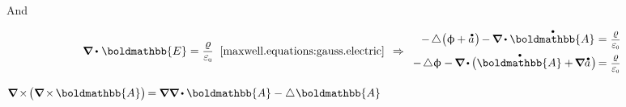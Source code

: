 And

\nopagebreak\vspace{-0.1em}\begin{equation}\label{electromagnetic.firstequationofwave}
\boldnabla \dotp \hspace{.12ex} \boldmathbb{E} = \displaystyle \frac{\chargedensity}{\raisemath{.16em}{\vacuumpermittivity}}
\;\;\eqref{maxwell.equations:gauss.electric}
\hspace{.44em} \Rightarrow
%
\begin{array}{r@{\hspace{.3em}}c@{\hspace{.3em}}l}
- \hspace{-0.1ex} \Laplacian \bigl( \upphi \hspace{-0.1ex} + \mathdotabove{a} \hspace{.1ex} \bigr) \hspace{-0.2ex} - \hspace{-0.15ex} \boldnabla \hspace{-0.1ex} \dotp \mathdotabove{\boldmathbb{A}} & = & \scalebox{0.9}{$\displaystyle \frac{\chargedensity}{\raisemath{.16em}{\vacuumpermittivity}}$}
\\[.66em]
- \hspace{-0.1ex} \Laplacian \upphi - \hspace{-0.15ex} \boldnabla \hspace{-0.12ex} \dotp \hspace{-0.12ex} \bigl( \mathdotabove{\boldmathbb{A}} + \hspace{-0.2ex} \boldnabla \mathdotabove{a} \hspace{.15ex} \bigr) \hspace*{-0.33ex} & = & \scalebox{0.9}{$\displaystyle \frac{\chargedensity}{\raisemath{.16em}{\vacuumpermittivity}}$}
\end{array}
\end{equation}

${\boldnabla \hspace{-0.2ex} \times \hspace{-0.3ex} \bigl( \boldnabla \hspace{-0.2ex} \times \hspace{-0.2ex} \boldmathbb{A} \bigr) \hspace{-0.25ex} = \hspace{-0.1ex} \boldnabla \boldnabla \hspace{-0.1ex} \dotp \boldmathbb{A} - \Laplacian \hspace{.05ex} \boldmathbb{A}}$

